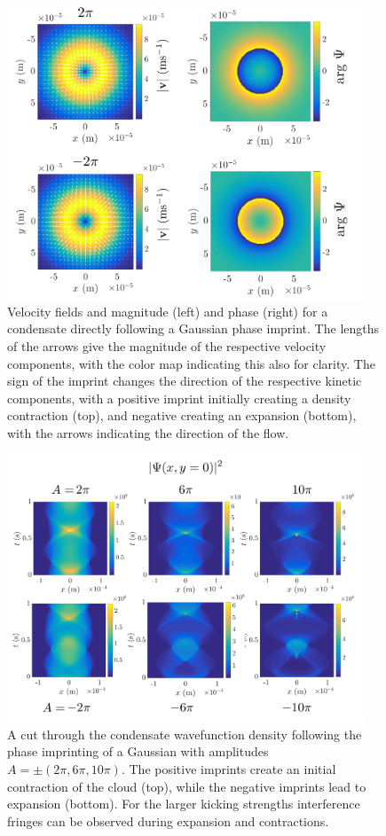 \begin{figure}\centering
    \includegraphics[width=0.95\textwidth]{Images/ch4_vtx/velocity/gaussian_imprint}
    \caption{Velocity fields and magnitude (left) and phase (right) for a condensate directly following a Gaussian phase imprint. The lengths of the arrows give the magnitude of the respective velocity components, with the color map indicating this also for clarity. The sign of the imprint changes the direction of the respective kinetic components, with a positive imprint initially creating a density contraction (top), and negative creating an expansion (bottom), with the arrows indicating the direction of the flow.}\label{fig:gaussian}
\end{figure}

\begin{figure}\centering
    \includegraphics[width=0.95\textwidth]{Images/ch4_vtx/gaussian_imprint_B}
    \caption{A cut through the condensate wavefunction density following the phase imprinting of a Gaussian with amplitudes $A=\pm ( 2\pi, 6\pi, 10\pi)$. The positive imprints create an initial contraction of the cloud (top), while the negative imprints lead to expansion (bottom). For the larger kicking strengths interference fringes can be observed during expansion and contractions.}\label{fig:gaussian_wfc}
\end{figure}

